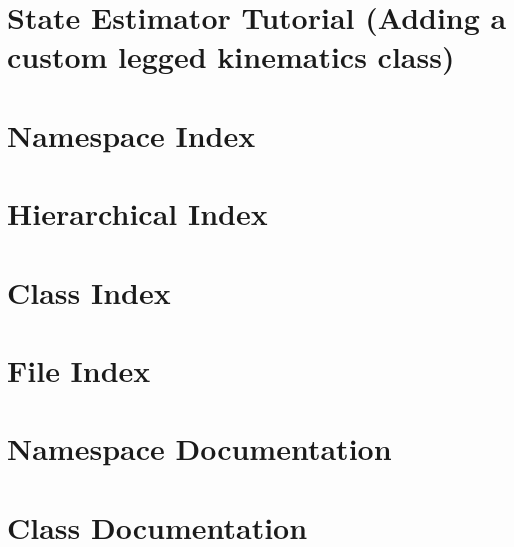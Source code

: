 \documentclass[twoside]{book}
\newcommand{\+}{\discretionary{\mbox{\scriptsize$\hookleftarrow$}}{}{}}
\begin{document}
\chapter{State Estimator Tutorial (Adding a custom legged kinematics class)}
\label{md__home_neofelis_VRX_drift_doc_tutorials_tutorial_legged_kinematics}

\chapter{Namespace Index}

\chapter{Hierarchical Index}

\chapter{Class Index}

\chapter{File Index}

\chapter{Namespace Documentation}











\chapter{Class Documentation}























\end{document}
